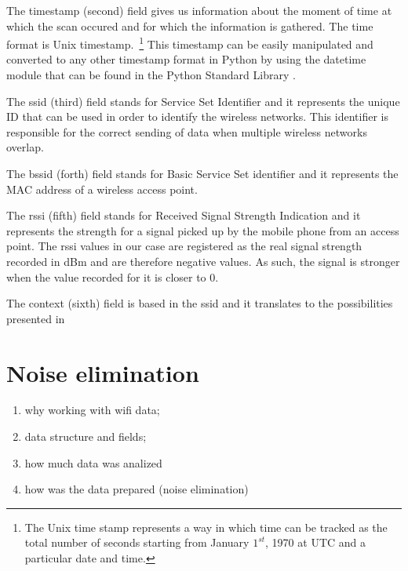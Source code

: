 The timestamp (second) field gives us information about the moment of time at
which the scan occured and for which the information is gathered. The time
format is Unix timestamp.~\footnote{The Unix time stamp represents a way in
which time can be tracked as the total number of seconds starting from January
$1^{st}$, 1970 at UTC and a particular date and time.} This timestamp can be
easily manipulated and converted to any other timestamp format in Python by
using the datetime module that can be found in the Python Standard Library
\cite{PSL}.

The ssid (third) field stands for Service Set Identifier and it represents the
unique ID that can be used in order to identify the wireless networks. This
identifier is responsible for the correct sending of data when multiple wireless
networks overlap.

The bssid (forth) field stands for Basic Service Set identifier and it
represents the MAC address of a wireless access point.

The rssi (fifth) field stands for Received Signal Strength Indication and it
represents the strength for a signal picked up by the mobile phone from an
access point. The rssi values in our case are registered as the real signal
strength recorded in dBm and are therefore negative values. As such, the signal
is stronger when the value recorded for it is closer to $0$.

The context (sixth) field is based in the ssid and it translates to the
possibilities presented in %

\section{Noise elimination}

\begin{enumerate}
\item why working with wifi data;
\item data structure and fields;
\item how much data was analized
\item how was the data prepared (noise elimination)
\end{enumerate}